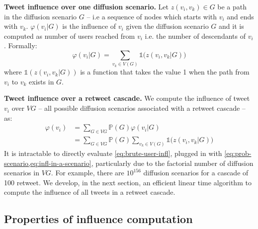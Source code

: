 \textbf{Tweet influence over one diffusion scenario.}
%
Let $z(v_i, v_k) \in G$ be a path in the diffusion scenario $G$ -- i.e a sequence of nodes which starts with $v_i$ and ends with $v_k$.
$\varphi(v_i | G)$ is the influence of $v_i$ given the diffusion scenario $G$ and it is computed as number of users reached from $v_i$ i.e. the number of descendants of $v_i$.
Formally:
\begin{equation}
	\varphi(v_i|G) 	=  \sum_{v_k \in V(G)} \mathds{1} \big(z(v_i,v_k | G) ) \label{eq:infl-in-a-scenario}
\end{equation}
where $\mathds{1} \left( z(v_i,v_k|G) \right)$ is a function that takes the value 1 when the path from $v_i$ to $v_k$ exists in $G$.

\textbf{Tweet influence over a retweet cascade.}
We compute the influence of tweet $v_i$ over $VG$ -- all possible diffusion scenarios associated with a retweet cascade -- as:
\begin{align}
	\varphi(v_i) 	&= \sum_{G\in{VG}} \mathds{P}(G) \varphi(v_i|G) \nonumber \\
				&= \sum_{G\in{VG}} \mathds{P}(G) \sum_{v_k \in V(G)} \mathds{1}\big( z(v_i,v_k|G) \big) \label{eq:brute-user-infl}
\end{align}
It is intractable to directly evaluate \cref{eq:brute-user-infl}, plugged in with \cref{eq:prob-scenario,eq:infl-in-a-scenario}, particularly due to the factorial number of diffusion scenarios in $VG$.
For example, there are $10^{156}$ diffusion scenarios for a cascade of 100 retweet.
We develop, in the next section, an efficient linear time algorithm to compute the influence of all tweets in a retweet cascade.

\subsection{Properties of influence computation}

